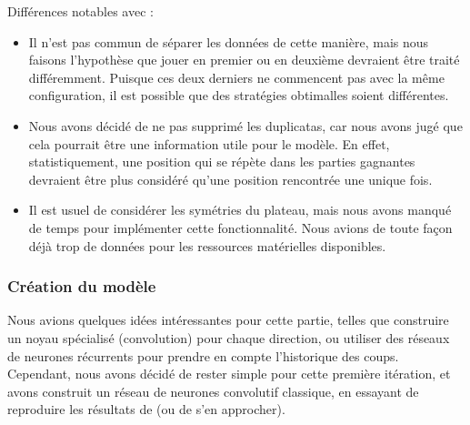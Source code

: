 Différences notables avec \cite{Liskowski_2018} :
\begin{itemize}
    \item Il n'est pas commun de séparer les données de cette manière, mais nous faisons l'hypothèse que jouer en premier ou en deuxième devraient être traité différemment. Puisque ces deux derniers ne commencent pas avec la même configuration, il est possible que des stratégies obtimalles soient différentes.
    \item Nous avons décidé de ne pas supprimé les duplicatas, car nous avons jugé que cela pourrait être une information utile pour le modèle. En effet, statistiquement, une position qui se répète dans les parties gagnantes devraient être plus considéré qu'une position rencontrée une unique fois.
    \item Il est usuel de considérer les symétries du plateau, mais nous avons manqué de temps pour implémenter cette fonctionnalité. Nous avions de toute façon déjà trop de données pour les ressources matérielles disponibles.
\end{itemize}

\subsubsection{Création du modèle}
\label{subsubsec:model}
Nous avions quelques idées intéressantes pour cette partie, telles que construire un noyau spécialisé (convolution) pour chaque direction, ou utiliser des réseaux de neurones récurrents pour prendre en compte l'historique des coups. Cependant, nous avons décidé de rester simple pour cette première itération, et avons construit un réseau de neurones convolutif classique, en essayant de reproduire les résultats de \cite{Liskowski_2018} (ou de s'en approcher).

